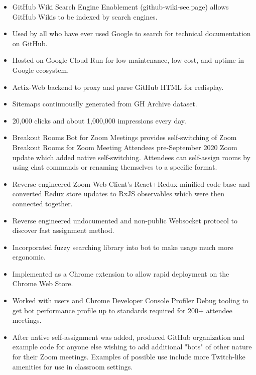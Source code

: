 \documentclass[10pt,letter,ragged2e]{altacv}
\begin{document}
\begin{paracol}{2}
\begin{itemize}
\item GitHub Wiki Search Engine Enablement (github-wiki-see.page) allows GitHub Wikis to be indexed by search engines. 
\item Used by all who have ever used Google to search for technical documentation on GitHub.
\item Hosted on Google Cloud Run for low maintenance, low cost, and uptime in Google ecosystem.
\item Actix-Web backend to proxy and parse GitHub HTML for redisplay.
\item Sitemaps continuouslly generated from GH Archive dataset.
\item 20,000 clicks and about 1,000,000 impressions every day.
\end{itemize}


\begin{itemize}
\item Breakout Rooms Bot for Zoom Meetings provides self-switching of Zoom Breakout Rooms for Zoom Meeting Attendees pre-September 2020 Zoom update which added native self-switching. Attendees can self-assign rooms by using chat commands or renaming themselves to a specific format.
\item Reverse engineered Zoom Web Client's React+Redux minified code base and converted Redux store updates to RxJS observables which were then connected together.
\item Reverse engineered undocumented and non-public Websocket protocol to discover fast assignment method.
\item Incorporated fuzzy searching library into bot to make usage much more ergonomic.
\item Implemented as a Chrome extension to allow rapid deployment on the Chrome Web Store.
\item Worked with users and Chrome Developer Console Profiler Debug tooling to get bot performance profile up to standards required for 200+ attendee meetings.
\item After native self-assignment was added, produced GitHub organization and example code for anyone else wishing to add additional "bots" of other nature for their Zoom meetings. Examples of possible use include more Twitch-like amenities for use in classroom settings.
\end{itemize}


\end{paracol}
\end{document}
